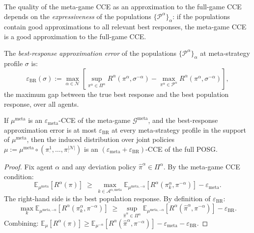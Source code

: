 The quality of the meta-game CCE as an approximation to the full-game CCE depends on the \emph{expressiveness} of the populations $\{\mathcal{P}^\alpha\}_\alpha$: if the populations contain good approximations to all relevant best responses, the meta-game CCE is a good approximation to the full-game CCE.

\begin{definition}\label{def:br-error}
The \emph{best-response approximation error} of the populations $\{\mathcal{P}^\alpha\}_\alpha$ at meta-strategy profile $\sigma$ is:
\[
\varepsilon_{\mathrm{BR}}(\sigma) := \max_{\alpha\in\mathcal{N}} \left[\sup_{\pi^\alpha\in\Pi^\alpha} R^\alpha(\pi^\alpha, \sigma^{-\alpha}) - \max_{\pi^\alpha\in\mathcal{P}^\alpha} R^\alpha(\pi^\alpha, \sigma^{-\alpha})\right],
\]
the maximum gap between the true best response and the best population response, over all agents.
\end{definition}

\begin{theorem}\label{thm:meta-to-full}
If $\mu^{\mathrm{meta}}$ is an $\varepsilon_{\mathrm{meta}}$-CCE of the meta-game $\mathcal{G}^{\mathrm{meta}}$, and the best-response approximation error is at most $\varepsilon_{\mathrm{BR}}$ at every meta-strategy profile in the support of $\mu^{\mathrm{meta}}$, then the induced distribution over joint policies $\mu := \mu^{\mathrm{meta}}\circ(\pi^1_{\cdot},\ldots,\pi^{|\mathcal{N}|}_{\cdot})$ is an $(\varepsilon_{\mathrm{meta}} + \varepsilon_{\mathrm{BR}})$-CCE of the full POSG.
\end{theorem}

\begin{proof}
Fix agent $\alpha$ and any deviation policy $\hat\pi^\alpha\in\Pi^\alpha$. By the meta-game CCE condition:
\[
\mathbb{E}_{\mu^{\mathrm{meta}}}[R^\alpha(\pi)] \;\ge\; \max_{k\in\mathcal{A}^{\alpha,\mathrm{meta}}}\mathbb{E}_{\mu^{\mathrm{meta},-\alpha}}[R^\alpha(\pi^\alpha_k, \pi^{-\alpha})] - \varepsilon_{\mathrm{meta}}.
\]
The right-hand side is the best population response. By definition of $\varepsilon_{\mathrm{BR}}$:
\[
\max_{k} \mathbb{E}_{\mu^{\mathrm{meta},-\alpha}}[R^\alpha(\pi^\alpha_k, \pi^{-\alpha})] \;\ge\; \sup_{\hat\pi^\alpha\in\Pi^\alpha}\mathbb{E}_{\mu^{\mathrm{meta},-\alpha}}[R^\alpha(\hat\pi^\alpha, \pi^{-\alpha})] - \varepsilon_{\mathrm{BR}}.
\]
Combining: $\mathbb{E}_\mu[R^\alpha(\pi)] \ge \mathbb{E}_{\mu^{-\alpha}}[R^\alpha(\hat\pi^\alpha,\pi^{-\alpha})] - \varepsilon_{\mathrm{meta}} - \varepsilon_{\mathrm{BR}}$.
\end{proof}


